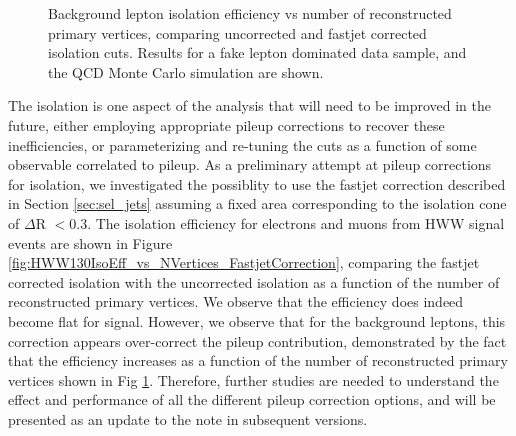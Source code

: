 \begin{figure}[!htbp]
\begin{center}
\caption{Background lepton isolation efficiency vs number of reconstructed primary vertices, comparing uncorrected 
and fastjet corrected isolation cuts. Results for a fake lepton dominated data sample, and the QCD Monte Carlo simulation
are shown. }
\label{fig:BkgIsoEff_vs_NVertices_FastjetCorrection}
\end{center}
\end{figure}


The isolation is one aspect of the analysis that will need to be improved in the future, 
either employing appropriate pileup corrections to recover these inefficiencies, or 
parameterizing and re-tuning the cuts as a function of some observable correlated
to pileup. As a preliminary attempt at pileup corrections for isolation, we investigated
the possiblity to use the fastjet correction described in Section \ref{sec:sel_jets} 
assuming a fixed area corresponding to the isolation cone of $\Delta$R $< 0.3$. 
The isolation efficiency for electrons and muons from HWW signal events are shown in 
Figure \ref{fig:HWW130IsoEff_vs_NVertices_FastjetCorrection}, comparing
the fastjet corrected isolation with the uncorrected isolation as a function of the 
number of reconstructed primary vertices. We observe that the efficiency does indeed become 
flat for signal. However, we observe that for the background leptons, this correction appears
over-correct the pileup contribution, demonstrated by the fact that the efficiency increases
as a function of the number of reconstructed primary vertices shown in Fig 
\ref{fig:BkgIsoEff_vs_NVertices_FastjetCorrection}. Therefore, further studies are needed to 
understand the effect and performance of all the different pileup correction options, and
will be presented as an update to the note in subsequent versions.


